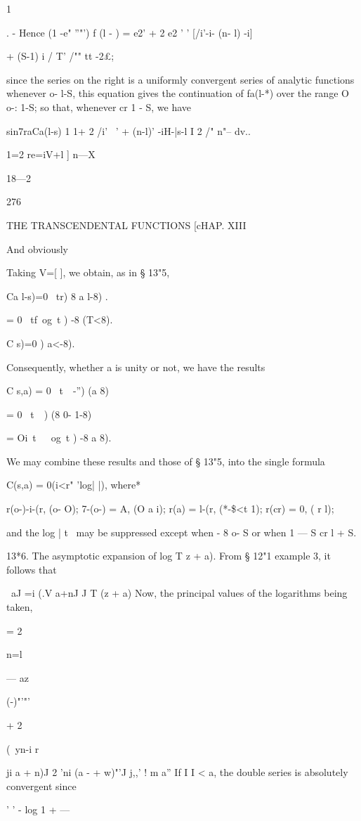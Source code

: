 {{1 %

. - Hence (1 -e" ''"') f (l - ) = e2' + 2 e2 ' ' [/i'-i- (n- l) -i]

+ (S-1) i / T' /"" tt -2£;

since the series on the right is a uniformly convergent series of
analytic functions whenever o- l-S, this equation gives the
continuation of fa(l-*) over the range O o-: 1-S; so that, whenever cr
1 - S, we have

sin7raCa(l-s) 1 1+ 2 /i' ~' + (n-l)' -iH-|s-l I 2 /" n"-- dv..

1=2 re=iV+l ] n—X

18—2

276

THE TRANSCENDENTAL FUNCTIONS [cHAP. XIII

And obviously

Taking V=[ ], we obtain, as in § 13"5,

Ca l-s)=0 \ tr) 8 a l-8) .

= 0 \ tf\ og\ t ) -8 (T<8).

C s)=0 ) a<-8).

Consequently, whether a is unity or not, we have the results

C s,a) = 0 \ t\ \ -'') (a 8)

= 0 \ t\ \ ) (8 0- 1-8)

= Oi\ t\ \ \ og\ t ) -8 a 8).

We may combine these results and those of § 13"5, into the single
formula

C(s,a) = 0(i<r" 'log| |), where*

r(o-)-i-(r, (o- O); 7-(o-) = A, (O a i); r(a) = l-(r, (*-\$<t 1);
r(cr) = 0, ( r l);

and the log | t \ may be suppressed except when - 8 o- S or when 1 — S
cr l + S.

13*6. The asymptotic expansion of log T z + a). From § 12"1 example 3,
it follows that

\ aJ =i (.V a+nJ J T (z + a) Now, the principal values of the
logarithms being taken,

= 2

n=l

— az

  (-)"'"'

+ 2

(\ yn-i r

ji a + n)J 2 'ni (a - + w)"'J j,,' ! m a'' If I I < a, the double
series is absolutely convergent since

' ' - log 1 + —

}}
